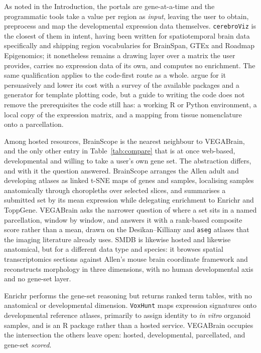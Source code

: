 \documentclass[pdflatex,sn-basic]{sn-jnl}
\begin{document}
As noted in the Introduction, the portals are gene-at-a-time and the
programmatic tools take a value per region as \emph{input}, leaving the user to
obtain, preprocess and map the developmental expression data themselves.
\texttt{cerebroViz} \citep{Bahl2017} is the closest of them in intent, having
been written for spatiotemporal brain data specifically and shipping region
vocabularies for BrainSpan, GTEx and Roadmap Epigenomics; it nonetheless remains
a drawing layer over a matrix the user provides, carries no expression data of
its own, and computes no enrichment. The same qualification applies to the
code-first route as a whole. \citet{Chopra2023} argue for it persuasively and
lower its cost with a survey of the available packages and a generator for
template plotting code, but a guide to writing the code does not remove the
prerequisites the code still has: a working R or Python environment, a local
copy of the expression matrix, and a mapping from tissue nomenclature onto a
parcellation.

Among hosted resources, BrainScope \citep{Huisman2017} is the nearest neighbour
to VEGABrain, and the only other entry in Table~\ref{tab:compare} that is at
once web-based, developmental and willing to take a user's own gene set. The
abstraction differs, and with it the question answered. BrainScope arranges the
Allen adult and developing atlases as linked t-SNE maps of genes and samples,
localising samples anatomically through choropleths over selected slices, and
summarises a submitted set by its mean expression while delegating enrichment to
Enrichr and ToppGene. VEGABrain asks the narrower question of where a set sits
in a named parcellation, window by window, and answers it with a rank-based
composite score rather than a mean, drawn on the Desikan--Killiany and
\texttt{aseg} atlases that the imaging literature already uses. SMDB
\citep{Cao2023} is likewise hosted and likewise anatomical, but for a different
data type and species: it browses spatial transcriptomics sections against
Allen's mouse brain coordinate framework and reconstructs morphology in three
dimensions, with no human developmental axis and no gene-set layer.

Enrichr \citep{Chen2013,Kuleshov2016} performs the gene-set reasoning but
returns ranked term tables, with no anatomical or developmental dimension.
\texttt{VoxHunt} \citep{Fleck2021} maps expression signatures onto developmental
reference atlases, primarily to assign identity to \emph{in vitro} organoid
samples, and is an R package rather than a hosted service. VEGABrain occupies the
intersection the others leave open: hosted, developmental, parcellated, and
gene-set \emph{scored}.
\end{document}
